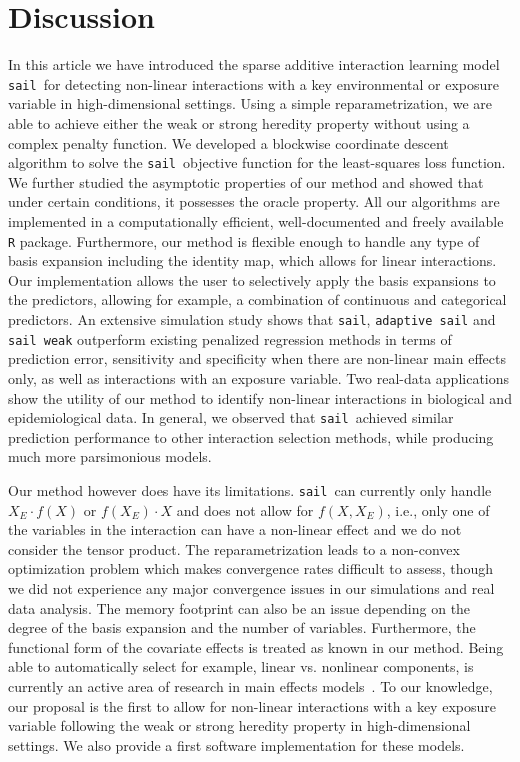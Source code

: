 \documentclass[12pt,letter]{article}\usepackage[]{graphicx}\usepackage[]{color}
\newcommand{\sail}{\texttt{sail}}
\begin{document}
\section{Discussion} \label{sec:sail_discussion}

In this article we have introduced the sparse additive interaction learning model \sail ~for detecting non-linear interactions with a key environmental or exposure variable in high-dimensional settings.
Using a simple reparametrization, we are able to achieve either the weak or strong heredity property without using a complex penalty function. 
We developed a blockwise coordinate descent algorithm to solve the \sail ~objective function  for the least-squares loss function.
We further studied the asymptotic properties of our method and showed that under certain conditions, it possesses the oracle property.
All our algorithms are implemented in a computationally efficient, well-documented and freely available \texttt{R} package.
Furthermore, our method is flexible enough to handle any type of basis expansion including the identity map, which allows for linear interactions.
Our implementation allows the user to selectively apply the basis expansions to the predictors, allowing for example, a combination of continuous and categorical predictors.
An extensive simulation study shows that \sail, \texttt{adaptive sail} and \texttt{sail weak} outperform existing penalized regression methods in terms of prediction error, sensitivity and specificity when there are non-linear main effects only, as well as interactions with an exposure variable.
Two real-data applications show the utility of our method to identify non-linear interactions in biological and epidemiological data. 
In general, we observed that \sail ~achieved similar prediction performance to other interaction selection methods, while producing much more parsimonious models. 

Our method however does have its limitations. \sail ~can currently only handle $X_E \cdot f(X)$ or $f(X_E) \cdot X$ and does not allow for $f(X, X_E)$, i.e., only one of the variables in the interaction can have a non-linear effect and we do not consider the tensor product. 
The reparametrization leads to a non-convex optimization problem which makes convergence rates difficult to assess, though we did not experience any major convergence issues in our simulations and real data analysis. 
The memory footprint can also be an issue depending on the degree of the basis expansion and the number of variables. 
Furthermore, the functional form of the covariate effects is treated as known in our method. 
Being able to automatically select for example, linear vs. nonlinear components, is currently an active area of research in main effects models~\citep{haris2016nonparametric}.
To our knowledge, our proposal is the first to allow for non-linear interactions with a key exposure variable following the weak or strong heredity property in high-dimensional settings. 
We also provide a first software implementation for these models.
\end{document}
